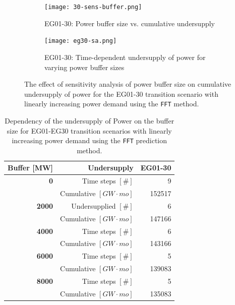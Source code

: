 \begin{figure}[]
	\centering
	\begin{subfigure}[t]{\textwidth}
		\centering
		\texttt{[image: 30-sens-buffer.png]} 
		\caption{EG01-30: Power buffer size vs. cumulative undersupply}
		\label{fig:eg30-bufplot}
	\end{subfigure}
	\begin{subfigure}[t]{\textwidth}
		\centering
		\texttt{[image: eg30-sa.png]} 
		\caption{EG01-30: Time-dependent undersupply of power for varying power buffer sizes}
		\label{fig:eg30-dotplot}
	\end{subfigure}
	\hfill
    \caption{The effect of sensitivity analysis of power buffer size on cumulative 
    undersupply of power for the EG01-30 transition scenario with linearly 
    increasing power demand using the \texttt{FFT} method.}
	\label{fig:sabuffer}
\end{figure}

\begin{table}[h]
    \centering
    \doublespacing
	\caption{Dependency of the undersupply of Power on the buffer size 
	for EG01-EG30 transition scenarios with linearly 
	increasing power demand using the \texttt{FFT} prediction method.}
	\label{tab:buff_size}
	\small
	\begin{tabular}{rrr}
                \hline
                \textbf{Buffer [MW]}     & \textbf{Undersupply}               & \textbf{EG01-30} \\
		\hline
		\textbf{0}             & Time steps $[\#]$  & 9\\  
                      & Cumulative $[GW\cdot mo]$    & 152517 \\ \hline
        \textbf{2000}          & Undersupplied $[\#]$ & 6 \\  
        	      & Cumulative $[GW\cdot mo]$   & 147166 \\ \hline
        \textbf{4000}         & Time steps $[\#]$ & 6 \\  
				  & Cumulative $[GW\cdot mo]$     & 143166 \\ \hline
        \textbf{6000}          & Time steps $[\#]$  & 5 \\  
		& Cumulative $[GW\cdot mo]$     & 139083 \\ \hline
        \textbf{8000}          & Time steps $[\#]$  & 5  \\  
	              & Cumulative $[GW\cdot mo]$  & 135083 \\ \hline
	\end{tabular}
\end{table}

